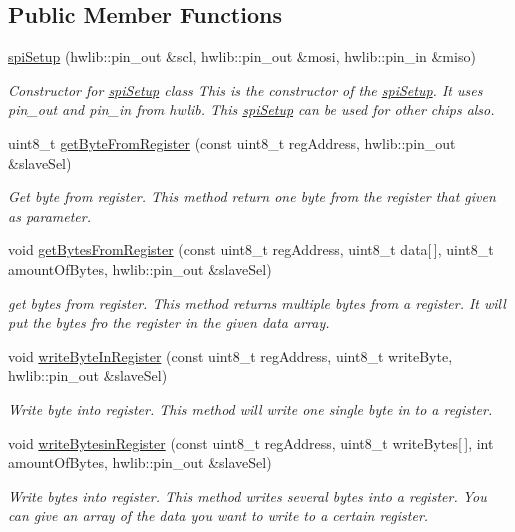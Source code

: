 \subsection*{Public Member Functions}
\begin{DoxyCompactItemize}
\item 
\hyperlink{classspiSetup_a4acc1a08e4a3ce57cb145b2fec525325}{spi\+Setup} (hwlib\+::pin\+\_\+out \&scl, hwlib\+::pin\+\_\+out \&mosi, hwlib\+::pin\+\_\+in \&miso)
\begin{DoxyCompactList}\small\item\em Constructor for \hyperlink{classspiSetup}{spi\+Setup} class  This is the constructor of the \hyperlink{classspiSetup}{spi\+Setup}. It uses pin\+\_\+out and pin\+\_\+in from hwlib. This \hyperlink{classspiSetup}{spi\+Setup} can be used for other chips also. \end{DoxyCompactList}\item 
uint8\+\_\+t \hyperlink{classspiSetup_a8c4709981af56eb9886f57a58fc15349}{get\+Byte\+From\+Register} (const uint8\+\_\+t reg\+Address, hwlib\+::pin\+\_\+out \&slave\+Sel)
\begin{DoxyCompactList}\small\item\em Get byte from register.  This method return one byte from the register that given as parameter. \end{DoxyCompactList}\item 
void \hyperlink{classspiSetup_a2dd360ed8351469fe8dbb78d25a73e1b}{get\+Bytes\+From\+Register} (const uint8\+\_\+t reg\+Address, uint8\+\_\+t data\mbox{[}$\,$\mbox{]}, uint8\+\_\+t amount\+Of\+Bytes, hwlib\+::pin\+\_\+out \&slave\+Sel)
\begin{DoxyCompactList}\small\item\em get bytes from register.  This method returns multiple bytes from a register. It will put the bytes fro the register in the given data array. \end{DoxyCompactList}\item 
void \hyperlink{classspiSetup_a5b745f869799cc7f6aacaef8f6f74f8d}{write\+Byte\+In\+Register} (const uint8\+\_\+t reg\+Address, uint8\+\_\+t write\+Byte, hwlib\+::pin\+\_\+out \&slave\+Sel)
\begin{DoxyCompactList}\small\item\em Write byte into register.  This method will write one single byte in to a register. \end{DoxyCompactList}\item 
void \hyperlink{classspiSetup_ab95cbedeebaf5d86bd7a927226bb67e6}{write\+Bytesin\+Register} (const uint8\+\_\+t reg\+Address, uint8\+\_\+t write\+Bytes\mbox{[}$\,$\mbox{]}, int amount\+Of\+Bytes, hwlib\+::pin\+\_\+out \&slave\+Sel)
\begin{DoxyCompactList}\small\item\em Write bytes into register.  This method writes several bytes into a register. You can give an array of the data you want to write to a certain register. \end{DoxyCompactList}\end{DoxyCompactItemize}


